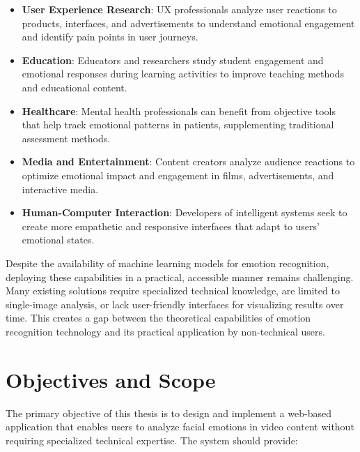 \begin{itemize}
    \item \textbf{User Experience Research}: UX professionals analyze user reactions to products, interfaces, and advertisements to understand emotional engagement and identify pain points in user journeys.

    \item \textbf{Education}: Educators and researchers study student engagement and emotional responses during learning activities to improve teaching methods and educational content.

    \item \textbf{Healthcare}: Mental health professionals can benefit from objective tools that help track emotional patterns in patients, supplementing traditional assessment methods.

    \item \textbf{Media and Entertainment}: Content creators analyze audience reactions to optimize emotional impact and engagement in films, advertisements, and interactive media.

    \item \textbf{Human-Computer Interaction}: Developers of intelligent systems seek to create more empathetic and responsive interfaces that adapt to users' emotional states.
\end{itemize}

Despite the availability of machine learning models for emotion recognition, deploying these capabilities in a practical, accessible manner remains challenging. Many existing solutions require specialized technical knowledge, are limited to single-image analysis, or lack user-friendly interfaces for visualizing results over time. This creates a gap between the theoretical capabilities of emotion recognition technology and its practical application by non-technical users.

\section{Objectives and Scope}
\label{sec:objectives}

The primary objective of this thesis is to design and implement a web-based application that enables users to analyze facial emotions in video content without requiring specialized technical expertise. The system should provide:

